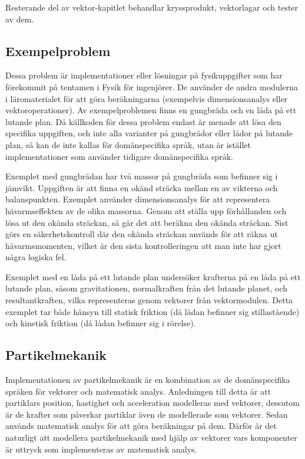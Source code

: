 Resterande del av vektor-kapitlet behandlar kryssprodukt, vektorlagar och tester av dem.

\subsection{Exempelproblem}

Dessa problem är implementationer eller lösningar på fysikuppgifter som har förekommit på tentamen i Fysik för ingenjörer. De använder de andra modulerna i läromaterialet för att göra beräkningarna (exempelvis dimensionsanalys eller vektoroperationer). Av exempelproblemen finns en gungbräda och en låda på ett lutande plan. Då källkoden för dessa problem endast är menade att lösa den specifika uppgiften, och inte alla varianter på gungbrädor eller lådor på lutande plan, så kan de inte kallas för domänspecifika språk, utan är istället implementationer som använder tidigare domänspecifika språk.

Exemplet med gungbrädan har två massor på gungbräda som befinner sig i jämvikt. Uppgiften är att finna en okänd sträcka mellan en av vikterna och balanspunkten. Exemplet använder dimensionsanalys för att representera hävarmseffekten av de olika massorna. Genom att ställa upp förhållanden och lösa ut den okända sträckan, så går det att beräkna den okända sträckan. Sist görs en säkerhetskontroll där den okända sträckan används för att räkna ut hävarmsmomenten, vilket är den sista kontrolleringen att man inte har gjort några logiska fel.

Exemplet med en låda på ett lutande plan undersöker krafterna på en låda på ett lutande plan, såsom gravitationen, normalkraften från det lutande planet, och resultantkraften, vilka representeras genom vektorer från vektormodulen. Detta exemplet tar både hänsyn till statisk friktion (då lådan befinner sig stillastående) och kinetisk friktion (då lådan befinner sig i rörelse).

\subsection{Partikelmekanik}

Implementationen av partikelmekanik är en kombination av de domänspecifika språken för vektorer och matematisk analys. Anledningen till detta är att partiklars position, hastighet och acceleration modelleras med vektorer, dessutom är de krafter som påverkar partiklar även de modellerade som vektorer. Sedan används matematisk analys för att göra beräkningar på dem. Därför är det naturligt att modellera partikelmekanik med hjälp av vektorer vars komponenter är uttryck som implementeras av matematisk analys.

